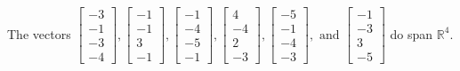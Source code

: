 \begin{exercise}
\begin{exerciseStatement}
  \end{exerciseStatement}
  \begin{exerciseAnswer}
   The vectors \(\left[\begin{array}{r}
-3 \\
-1 \\
-3 \\
-4
\end{array}\right] , \left[\begin{array}{r}
-1 \\
-1 \\
3 \\
-1
\end{array}\right] , \left[\begin{array}{r}
-1 \\
-4 \\
-5 \\
-1
\end{array}\right] , \left[\begin{array}{r}
4 \\
-4 \\
2 \\
-3
\end{array}\right] , \left[\begin{array}{r}
-5 \\
-1 \\
-4 \\
-3
\end{array}\right] , \text{ and } \left[\begin{array}{r}
-1 \\
-3 \\
3 \\
-5
\end{array}\right]\) 
  	 do  
	span \(\mathbb{R}^4\).
  


  \end{exerciseAnswer}
\end{exercise}